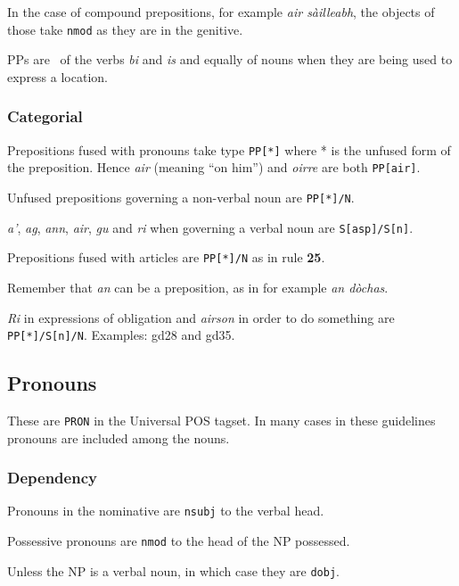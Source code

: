 \documentclass[a4paper]{article}
\begin{document}
 In the case of compound prepositions, for example \textit{air s\`ailleabh}, the objects of those take \texttt{nmod} as they are in the genitive.

 PPs are \adpmod\ of the verbs \textit{bi} and \textit{is} and equally of nouns when they are being used to express a location.

\subsubsection*{Categorial}
 Prepositions fused with pronouns take type \texttt{PP[*]} where * is the unfused form of the preposition.
Hence \textit{air} (meaning ``on him'') and \textit{oirre} are both \texttt{PP[air]}.

 Unfused prepositions governing a non-verbal noun are \texttt{PP[*]/N}.

 \textit{a'}, \textit{ag}, \textit{ann}, \textit{air}, \textit{gu} and \textit{ri} when governing a verbal noun are \texttt{S[asp]/S[n]}.

 Prepositions fused with articles are \texttt{PP[*]/N} as in rule {\bf 25}.

 Remember that \textit{an} can be a preposition, as in for example \textit{an d\`ochas}.

 \textit{Ri} in expressions of obligation and \textit{airson} in order to do something are \texttt{PP[*]/S[n]/N}. Examples: gd28 and gd35.

\subsection{Pronouns\label{subsect:pronouns}}

These are \texttt{PRON} in the Universal POS tagset. In many cases in these guidelines pronouns are included among the nouns.

\subsubsection*{Dependency}

 Pronouns in the nominative are \texttt{nsubj} to the verbal head.

 Possessive pronouns are \texttt{nmod} to the head of the NP possessed.

 Unless the NP is a verbal noun, in which case they are \texttt{dobj}.
\end{document}
